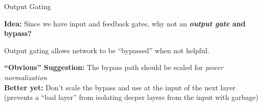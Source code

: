\begin{slide}[\slideopts,toc={Skip Connection}]{Output Gating}

  \vspace{-1em}

  \textbf{Idea:} Since we have input and feedback gates, why not an \textbf{\emph{output gate} and bypass?}


\maybepause
Output gating allows network to be ``bypassed'' when not helpful.

\begin{itemize}
\mpitem \textbf{``Obvious'' Suggestion:} The bypass path should be scaled for \emph{power normalization}\\
\mpitem \textbf{Better yet:} Don't scale the bypass and use  at the input of the next layer\\
(prevents a ``bad layer'' from isolating deeper layers from the input with garbage)
\end{itemize}

\end{slide}

